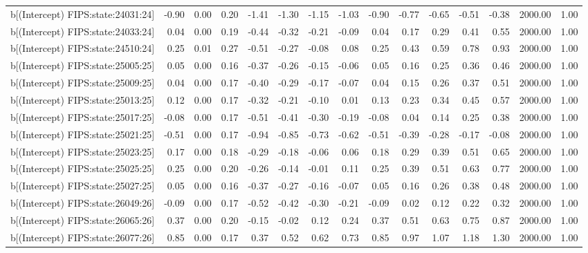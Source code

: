 \begin{table}[ht]
\begin{tabular}{rrrrrrrrrrrrrrr}
  b[(Intercept) FIPS:state:24031:24] & -0.90 & 0.00 & 0.20 & -1.41 & -1.30 & -1.15 & -1.03 & -0.90 & -0.77 & -0.65 & -0.51 & -0.38 & 2000.00 & 1.00 \\ 
  b[(Intercept) FIPS:state:24033:24] & 0.04 & 0.00 & 0.19 & -0.44 & -0.32 & -0.21 & -0.09 & 0.04 & 0.17 & 0.29 & 0.41 & 0.55 & 2000.00 & 1.00 \\ 
  b[(Intercept) FIPS:state:24510:24] & 0.25 & 0.01 & 0.27 & -0.51 & -0.27 & -0.08 & 0.08 & 0.25 & 0.43 & 0.59 & 0.78 & 0.93 & 2000.00 & 1.00 \\ 
  b[(Intercept) FIPS:state:25005:25] & 0.05 & 0.00 & 0.16 & -0.37 & -0.26 & -0.15 & -0.06 & 0.05 & 0.16 & 0.25 & 0.36 & 0.46 & 2000.00 & 1.00 \\ 
  b[(Intercept) FIPS:state:25009:25] & 0.04 & 0.00 & 0.17 & -0.40 & -0.29 & -0.17 & -0.07 & 0.04 & 0.15 & 0.26 & 0.37 & 0.51 & 2000.00 & 1.00 \\ 
  b[(Intercept) FIPS:state:25013:25] & 0.12 & 0.00 & 0.17 & -0.32 & -0.21 & -0.10 & 0.01 & 0.13 & 0.23 & 0.34 & 0.45 & 0.57 & 2000.00 & 1.00 \\ 
  b[(Intercept) FIPS:state:25017:25] & -0.08 & 0.00 & 0.17 & -0.51 & -0.41 & -0.30 & -0.19 & -0.08 & 0.04 & 0.14 & 0.25 & 0.38 & 2000.00 & 1.00 \\ 
  b[(Intercept) FIPS:state:25021:25] & -0.51 & 0.00 & 0.17 & -0.94 & -0.85 & -0.73 & -0.62 & -0.51 & -0.39 & -0.28 & -0.17 & -0.08 & 2000.00 & 1.00 \\ 
  b[(Intercept) FIPS:state:25023:25] & 0.17 & 0.00 & 0.18 & -0.29 & -0.18 & -0.06 & 0.06 & 0.18 & 0.29 & 0.39 & 0.51 & 0.65 & 2000.00 & 1.00 \\ 
  b[(Intercept) FIPS:state:25025:25] & 0.25 & 0.00 & 0.20 & -0.26 & -0.14 & -0.01 & 0.11 & 0.25 & 0.39 & 0.51 & 0.63 & 0.77 & 2000.00 & 1.00 \\ 
  b[(Intercept) FIPS:state:25027:25] & 0.05 & 0.00 & 0.16 & -0.37 & -0.27 & -0.16 & -0.07 & 0.05 & 0.16 & 0.26 & 0.38 & 0.48 & 2000.00 & 1.00 \\ 
  b[(Intercept) FIPS:state:26049:26] & -0.09 & 0.00 & 0.17 & -0.52 & -0.42 & -0.30 & -0.21 & -0.09 & 0.02 & 0.12 & 0.22 & 0.32 & 2000.00 & 1.00 \\ 
  b[(Intercept) FIPS:state:26065:26] & 0.37 & 0.00 & 0.20 & -0.15 & -0.02 & 0.12 & 0.24 & 0.37 & 0.51 & 0.63 & 0.75 & 0.87 & 2000.00 & 1.00 \\ 
  b[(Intercept) FIPS:state:26077:26] & 0.85 & 0.00 & 0.17 & 0.37 & 0.52 & 0.62 & 0.73 & 0.85 & 0.97 & 1.07 & 1.18 & 1.30 & 2000.00 & 1.00 \\ 

\end{tabular}
\end{table}
